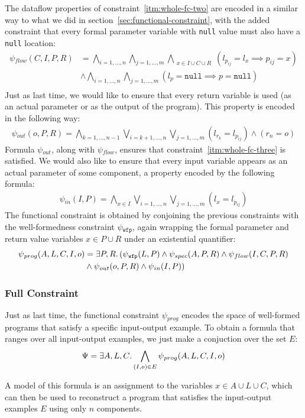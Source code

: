 The dataflow properties of constraint~\ref{itm:whole-fc-two} are encoded in a
similar way to what we did in section~\ref{sec:functional-constraint}, with the
added constraint that every formal parameter variable with \lstinline{null}
value must also have a \lstinline{null} location:
%
\begin{align*}
  \psi{}_{flow}(C,I,P,R)
  &=\bigwedge_{i=1,\ldots,n}
    \bigwedge_{j=1,\ldots,m}
    \bigwedge_{\substack{x \in I \cup C \cup R}}
    (l_{p_{ij}} = l_x \implies p_{ij} = x) \\
  &\wedge\bigwedge_{i=1,\ldots,n}
    \bigwedge_{j=1,\ldots,m}
    (l_p = \mathtt{null} \implies p = \mathtt{null}) \\
\end{align*}
%
\noindent
Just as last time, we would like to ensure that every return variable is used
(as an actual parameter or as the output of the program). This property is
encoded in the following way:
%
\begin{align*}
  \psi{}_{out}(o, P, R)
  =\bigwedge_{k=1,\ldots,n-1}
    \bigvee_{i=k+1,\ldots,n}
    \bigvee_{j=1,\ldots,m}
    (l_{r_k} = l_{p_{ij}})
  \wedge (r_n = o)
\end{align*}
%
\noindent
Formula $\psi{}_{out}$, along with $\psi{}_{flow}$, ensures that
constraint~\ref{itm:whole-fc-three} is satisfied.
We would also like to ensure that every input variable appears as an actual
parameter of some component, a property encoded by the following formula:
%
\begin{align*}
  \psi{}_{in}(I, P)
  =\bigwedge_{x \in I}
    \bigvee_{i=1,\ldots,n}
    \bigvee_{j=1,\ldots,m}
    (l_{x} = l_{p_{ij}})
\end{align*}
%
The functional constraint is obtained by conjoining the previous constraints
with the well-formedness constraint $\psi{}_{\mathtt{wfp}}$,
again wrapping the formal parameter and return value variables $x \in P \cup R$
under an existential quantifier:
%
\begin{align*}
  \psi{}_{prog}(A,L,C,I,o) &= \exists P,R\ldotp
  (\psi{}_{\mathtt{wfp}}(L, P) \wedge
  \psi{}_{spec}(A, P, R) \wedge
  \psi{}_{flow}(I, C, P, R)\\&\wedge 
  \psi{}_{out}(o, P, R) \wedge
  \psi{}_{in}(I, P))
\end{align*}

\subsubsection{Full Constraint}
\label{sec:whole-full-constraint}

Just as last time, the functional constraint $\psi{}_{prog}$ encodes the space
of well-formed programs that satisfy a specific input-output example.
To obtain a formula that ranges over all input-output examples, we just make a
conjuction over the set $E$:
%
\[
  \Psi{}=\exists{A,L,C}\ldotp\bigwedge_{(I, o) \in E}\psi{}_{prog}(A,L,C,I,o)
\]

A model of this formula is an assignment to the variables $x \in A \cup L \cup C$,
which can then be used to reconstruct a program that satisfies the input-output
examples $E$ using only $n$ components.
